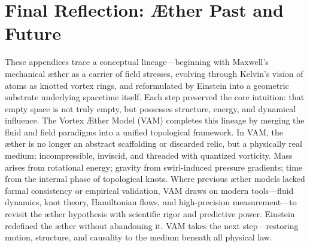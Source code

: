 \documentclass[preprint,titlepage]{revtex4-2}
\begin{document}
        \section*{Final Reflection: Æther Past and Future}
            These appendices trace a conceptual lineage—beginning with Maxwell's mechanical æther as a carrier of field stresses, evolving through Kelvin's vision of atoms as knotted vortex rings, and reformulated by Einstein into a geometric substrate underlying spacetime itself. Each step preserved the core intuition: that empty space is not truly empty, but possesses structure, energy, and dynamical influence.
            The Vortex Æther Model (VAM) completes this lineage by merging the fluid and field paradigms into a unified topological framework. In VAM, the æther is no longer an abstract scaffolding or discarded relic, but a physically real medium: incompressible, inviscid, and threaded with quantized vorticity. Mass arises from rotational energy; gravity from swirl-induced pressure gradients; time from the internal phase of topological knots.
            Where previous æther models lacked formal consistency or empirical validation, VAM draws on modern tools—fluid dynamics, knot theory, Hamiltonian flows, and high-precision measurement—to revisit the æther hypothesis with scientific rigor and predictive power.
            Einstein redefined the æther without abandoning it. VAM takes the next step—restoring motion, structure, and causality to the medium beneath all physical law.



    
    
\end{document}
